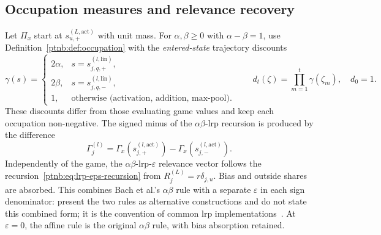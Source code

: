 \subsection{Occupation measures and relevance recovery}\label{ptnb:app:routing-attribution}

Let $\Pi_x$ start at $s_{u,+}^{(L,\mathrm{act})}$ with unit mass. For $\alpha,\beta\geq0$ with $\alpha-\beta=1$, use Definition~\ref{ptnb:def:occupation} with the \emph{entered-state} trajectory discounts
\begin{equation}\label{ptnb:eq:routing-edge-discount}
 \gamma(s)=\begin{cases}
 2\alpha,&s=s_{j,q,+}^{(l,\mathrm{lin})},\\
 2\beta,&s=s_{j,q,-}^{(l,\mathrm{lin})},\\
 1,&\text{otherwise (activation, addition, max-pool).}
 \end{cases}
 \qquad
 d_t(\zeta)=\prod_{m=1}^t\gamma(\zeta_m),\quad d_0=1.
\end{equation}
These discounts differ from those evaluating game values and keep each occupation non-negative. The signed minus of the $\alpha\beta$-\ac{lrp} recursion is produced by the difference
\begin{equation}\label{ptnb:eq:routing-Gamma-pair}
 \Gamma_j^{(l)}=\Gamma_x(s_{j,+}^{(l,\mathrm{act})})-\Gamma_x(s_{j,-}^{(l,\mathrm{act})}).
\end{equation}
Independently of the game, the $\alpha\beta$-\ac{lrp}-$\varepsilon$ relevance vector follows the recursion~\eqref{ptnb:eq:lrp-eps-recursion} from $R_j^{(L)}=r\delta_{j,u}$. Bias and outside shares are absorbed. This combines Bach et al.'s $\alpha\beta$ rule with a separate $\varepsilon$ in each sign denominator: \textcite{Bach2015} present the two rules as alternative constructions and do not state this combined form; it is the convention of common \ac{lrp} implementations~\parencite{Anders2021Zennit}. At $\varepsilon=0$, the affine rule is the original $\alpha\beta$ rule, with bias absorption retained.

